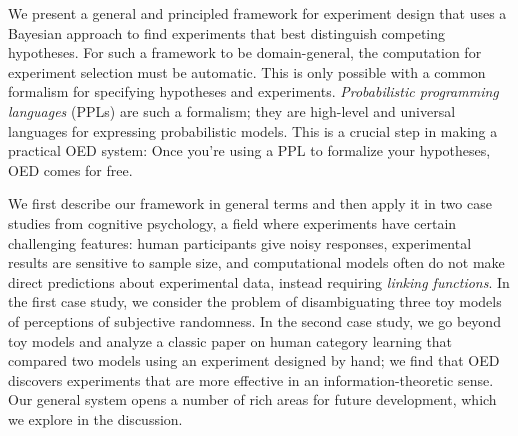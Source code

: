 \documentclass{article}
\newcommand{\ndg}[1]{\textcolor{Green}{[ndg: #1]}}
\begin{document}
We present a general and principled framework for experiment design that uses a Bayesian approach to find experiments that best distinguish competing hypotheses.
For such a framework to be domain-general, the computation for experiment selection must be automatic.
This is only possible with a common formalism for specifying hypotheses and experiments.
\emph{Probabilistic programming languages} (PPLs) are such a formalism; they are high-level and universal languages for expressing probabilistic models.
This is a crucial step in making a practical OED system: Once you're using a PPL to formalize your hypotheses, OED comes for free.

We first describe our framework in general terms and then apply it in two case studies from cognitive psychology, a field where experiments have certain challenging features: human participants give noisy responses, experimental results are sensitive to sample size, and computational models often do not make direct predictions about experimental data, instead requiring \emph{linking functions}.
In the first case study, we consider the problem of disambiguating three toy models of perceptions of subjective randomness.
In the second case study, we go beyond toy models and analyze a classic paper on human category learning that compared two models using an experiment designed by hand; we find that OED discovers experiments that are more effective in an information-theoretic sense.
Our general system opens a number of rich areas for future development, which we explore in the discussion.

\end{document}
